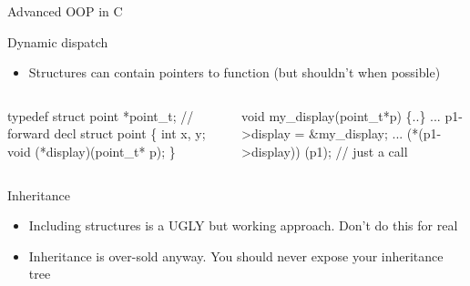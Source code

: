 \begin{frame}{Advanced OOP in C}
  \begin{block}{Dynamic dispatch}
    \begin{itemize}
    \item Structures can contain pointers to function (but shouldn't when possible)
    \end{itemize}
    \begin{columns}
      \begin{column}{.5\linewidth}
        \begin{boitecode}{}
typedef struct point *point_t; // forward decl
struct point \{
  int x, y;
  void \alert{(*display)}(point_t* p);
\} 
        \end{boitecode}
      \end{column}
      \begin{column}{.39\linewidth}
        \begin{boitecode}{}
void my_display(point_t*p) \{..\}
     ...
p1->display = &my\_display;          
     ...
(*(p1->display)) (p1); // just a call
        \end{boitecode}
      \end{column}
    \end{columns}
  \end{block}\vspace{-.3\baselineskip}

  \begin{block}{Inheritance}
    \begin{itemize}
    \item Including structures is a UGLY but working approach. \alert{Don't do
        this for real}
    \item Inheritance is over-sold anyway. You should never expose your
      inheritance tree
    \end{itemize}


\end{block}
\end{frame}

